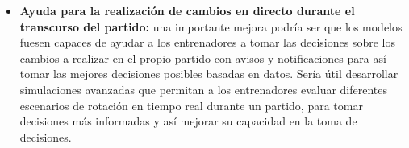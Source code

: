 \begin{itemize}
    \item \textbf{Ayuda para la realización de cambios en directo durante el transcurso del partido:} una importante mejora podría ser que los modelos fuesen capaces de ayudar a los entrenadores a tomar las decisiones sobre los cambios a realizar en el propio partido con avisos y notificaciones para así tomar las mejores decisiones posibles basadas en datos. Sería útil desarrollar simulaciones avanzadas que permitan a los entrenadores evaluar diferentes escenarios de rotación en tiempo real durante un partido, para tomar decisiones más informadas y así mejorar su capacidad en la toma de decisiones.
\end{itemize}

